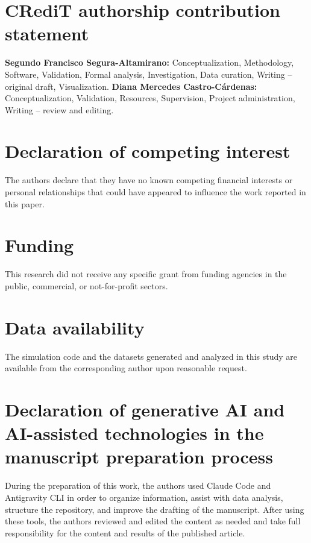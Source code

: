 \documentclass[preprint,review,12pt]{elsarticle}
\begin{document}

\section*{CRediT authorship contribution statement}
\textbf{Segundo Francisco Segura-Altamirano:} Conceptualization,
Methodology, Software, Validation, Formal analysis, Investigation, Data
curation, Writing -- original draft, Visualization.
\textbf{Diana Mercedes Castro-C\'ardenas:} Conceptualization, Validation,
Resources, Supervision, Project administration, Writing -- review and
editing.

\section*{Declaration of competing interest}
The authors declare that they have no known competing financial interests
or personal relationships that could have appeared to influence the work
reported in this paper.

\section*{Funding}
This research did not receive any specific grant from funding agencies in
the public, commercial, or not-for-profit sectors.

\section*{Data availability}
The simulation code and the datasets generated and analyzed in this study
are available from the corresponding author upon reasonable request.


\section*{Declaration of generative AI and AI-assisted technologies in the manuscript preparation process}
During the preparation of this work, the authors used Claude Code and
Antigravity CLI in order to organize information, assist with data
analysis, structure the repository, and improve the drafting of the
manuscript. After using these tools, the authors reviewed and edited the
content as needed and take full responsibility for the content and results
of the published article.



\end{document}
